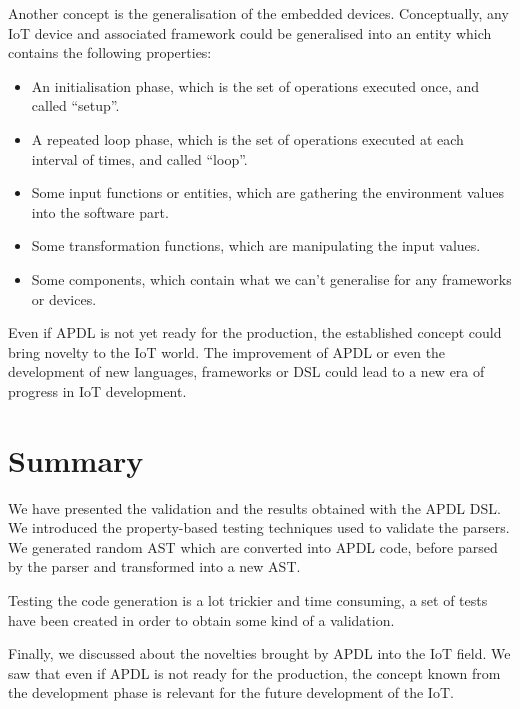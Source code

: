 Another concept is the generalisation of the embedded devices. Conceptually,
any \gls{IoT} device and associated framework could be generalised into an
entity which contains the following properties:

\begin{itemize}
\item An initialisation phase, which is the set of operations executed once,
  and called ``setup''.
\item A repeated loop phase, which is the set of operations executed at each
  interval of times, and called ``loop''.
\item Some input functions or entities, which are gathering the environment
  values into the software part.
\item Some transformation functions, which are manipulating the input values.
\item Some components, which contain what we can't generalise for any frameworks or devices.
\end{itemize}

Even if \gls{APDL} is not yet ready for the production, the established concept
could bring novelty to the \gls{IoT} world. The improvement of \gls{APDL} or
even the development of new languages, frameworks or \gls{DSL} could lead to a new
era of progress in \gls{IoT} development.

\section{Summary}
\label{sec:summary}

We have presented the validation and the results obtained with the \gls{APDL}
\gls{DSL}. We introduced the property-based testing techniques used to validate
the parsers. We generated random \gls{AST} which are converted into \gls{APDL}
code, before parsed by the parser and transformed into a new \gls{AST}.

Testing the code generation is a lot trickier and time consuming, a set of
tests have been created in order to obtain some kind of a validation.

Finally, we discussed about the novelties brought by \gls{APDL} into the
\gls{IoT} field. We saw that even if \gls{APDL} is not ready for the production,
the concept known from the development phase is relevant for the future
development of the \gls{IoT}.

